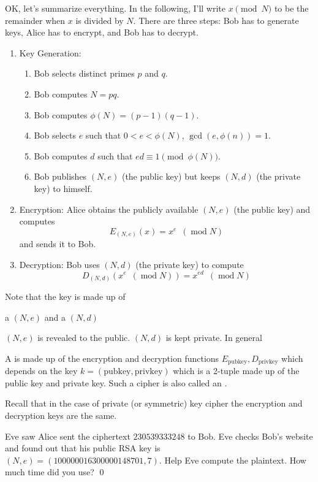 OK, let's summarize everything.
In the following, I'll write $x \pmod{N}$ to be the remainder when $x$
is divided by $N$.
There are three steps: Bob has to
generate keys, Alice has to encrypt, and Bob has to decrypt.
\begin{enumerate}[nosep]
 \item Key Generation:
  \begin{enumerate}
   \item Bob selects distinct primes $p$ and $q$.
   \item Bob computes $N = pq$.
   \item Bob computes $\phi(N) = (p-1)(q-1)$.
   \item Bob selects $e$ such that $0 < e < \phi(N)$,
   $\gcd(e, \phi(n)) = 1$.
   \item Bob computes $d$ such that
     $ed \equiv 1 \pmod{\phi(N)}$.
 \item Bob publishes $(N,e)$ (the public key) but keeps $(N,d)$
   (the private key) to himself.
  \end{enumerate}
 \item Encryption:
   Alice obtains the publicly available $(N,e)$ (the public key) and
   computes
  \[
   E_{(N,e)}(x) = x^e \,\,\,(\operatorname{mod} N)
  \]
  and sends it to Bob.
 \item Decryption: Bob uses $(N,d)$ (the private key) to compute
 \[
  D_{(N,d)}( x^e \,\,\,(\operatorname{mod} N) ) = x^{ed} \,\,\,(\operatorname{mod} N)
 \]
\end{enumerate}

Note that the key is made up of
\begin{enumerate}[nosep]
  \li a  $(N,e)$ and
  \li a  $(N,d)$
\end{enumerate}
$(N,e)$ is revealed to the public.
$(N,d)$ is kept private.
In general

\begin{defn}
  A  is made up of the encryption
  and decryption functions
  $E_{\text{pubkey}}, D_{\text{privkey}}$ which depends on
  the key
  $k = (\text{pubkey}, \text{privkey})$
  which is a 2-tuple made up of
  the public key and private key.
  Such a cipher is also called an
  .
\end{defn}

Recall that in the case of private (or symmetric) key cipher
the encryption and decryption keys are the same. 

\begin{ex}
  Eve saw Alice sent the ciphertext $230539333248$ to Bob.
  Eve checks Bob's website and found out that his public RSA key is
  $(N, e) = (100000016300000148701, 7)$.
  Help Eve compute the plaintext.
  How much time did you use? 
  \qed
\end{ex}
